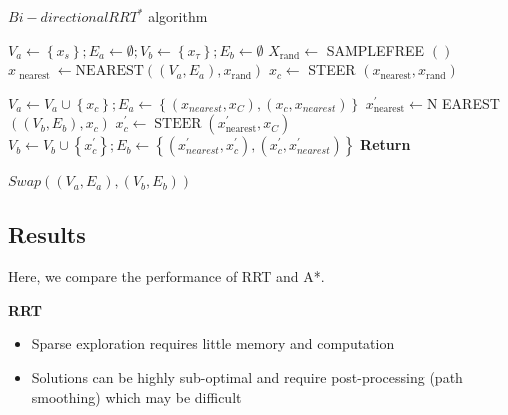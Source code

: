 \documentclass{article} %
\begin{document}
\begin{algorithm}[H]
    \caption{$Bi-directional RRT^*$ algorithm}\label{RRT}
    \begin{algorithmic}[1]
    
        \State $V_{a} \leftarrow\left\{x_{s}\right\} ; E_{a} \leftarrow \emptyset ; V_{b} \leftarrow\left\{x_{\tau}\right\} ; E_{b} \leftarrow \emptyset$
            \State $X_{\text {rand}} \leftarrow$ SAMPLEFREE $( )$
            \State $x_{\text { nearest }} \leftarrow \mathrm{NEAREST}\left(\left(V_{a}, E_{a}\right), x_{\text {rand}}\right)$
            \State $x_{c} \leftarrow$ STEER $\left(x_{\text {nearest}}, x_{\text {rand}}\right)$

                \State $V_{a} \leftarrow V_{a} \cup\left\{x_{c}\right\} ; E_{a} \leftarrow\left\{\left(x_{n e a r e s t}, x_{C}\right),\left(x_{c}, x_{n e a r e s t}\right)\right\}$ 
                \State $x_{\text {nearest}}^{\prime} \leftarrow \mathrm{N}$ EAREST $\left(\left(V_{b}, E_{b}\right), x_{c}\right)$
                \State $x_{c}^{\prime} \leftarrow \operatorname{STEER}\left(x_{\text {nearest}}^{\prime}, x_{C}\right)$
                    $V_{b} \leftarrow V_{b} \cup\left\{x_{c}^{\prime}\right\} ; E_{b} \leftarrow\left\{\left(x_{n e a r e s t}^{\prime}, x_{c}^{\prime}\right),\left(x_{c}^{\prime}, x_{n e a r e s t}^{\prime}\right)\right\}$
                \EndIf 
                \State \textbf{Return} 
            \EndIf

                \State $Swap\left(\left(V_{a}, E_{a}\right),\left(V_{b}, E_{b}\right)\right)$
            \EndIf            
            \EndIf
        \EndFor
    \EndWhile
    \EndProcedure
    \end{algorithmic}
\end{algorithm}


\subsection{Results}

Here, we compare the performance of RRT and A*.

\textbf{RRT}
\begin{itemize}
    \item Sparse exploration requires little memory and computation
    \item Solutions can be highly sub-optimal and require post-processing (path smoothing) which may be difficult
\end{itemize}
\end{document}
